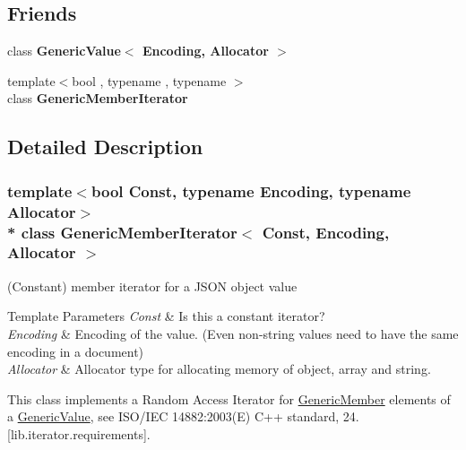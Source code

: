 \subsection*{Friends}
\begin{DoxyCompactItemize}
\item 
class {\bfseries Generic\+Value$<$ Encoding, Allocator $>$}\hypertarget{class_generic_member_iterator_a82bdd5798f1a5ac0e3e7ba4bd6938cfc}{}\label{class_generic_member_iterator_a82bdd5798f1a5ac0e3e7ba4bd6938cfc}

\item 
{\footnotesize template$<$bool , typename , typename $>$ }\\class {\bfseries Generic\+Member\+Iterator}\hypertarget{class_generic_member_iterator_aa375aeb1ffac85cddc3a72a6c24ec6e1}{}\label{class_generic_member_iterator_aa375aeb1ffac85cddc3a72a6c24ec6e1}

\end{DoxyCompactItemize}


\subsection{Detailed Description}
\subsubsection*{template$<$bool Const, typename Encoding, typename Allocator$>$\\*
class Generic\+Member\+Iterator$<$ Const, Encoding, Allocator $>$}

(Constant) member iterator for a J\+S\+ON object value 


\begin{DoxyTemplParams}{Template Parameters}
{\em Const} & Is this a constant iterator? \\
\hline
{\em Encoding} & Encoding of the value. (Even non-\/string values need to have the same encoding in a document) \\
\hline
{\em Allocator} & Allocator type for allocating memory of object, array and string.\\
\hline
\end{DoxyTemplParams}
This class implements a Random Access Iterator for \hyperlink{struct_generic_member}{Generic\+Member} elements of a \hyperlink{class_generic_value}{Generic\+Value}, see I\+S\+O/\+I\+EC 14882\+:2003(E) C++ standard, 24. \mbox{[}lib.\+iterator.\+requirements\mbox{]}.

